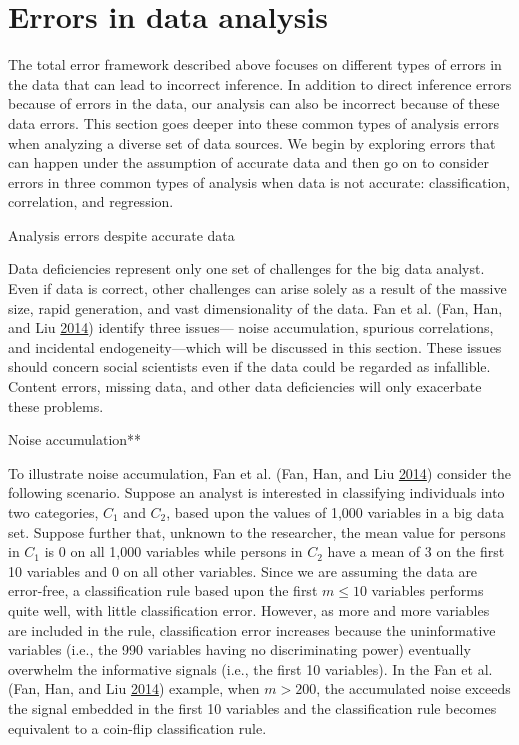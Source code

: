\documentclass[]{krantz}
\begin{document}
\section{Errors in data analysis}\label{sec:10-4}

The total error framework described above focuses on different types of
errors in the data that can lead to incorrect inference. In addition to
direct inference errors because of errors in the data, our analysis can
also be incorrect because of these data errors. This section goes deeper
into these common types of analysis errors when analyzing a diverse set
of data sources. We begin by exploring errors that can happen under the
assumption of accurate data and then go on to consider errors in three
common types of analysis when data is not accurate: classification,
correlation, and regression.

Analysis errors despite accurate data

Data deficiencies represent only one set of challenges for the big data
analyst. Even if data is correct, other challenges can arise solely as a
result of the massive size, rapid generation, and vast dimensionality of
the data. Fan et al. (Fan, Han, and Liu
\protect\hyperlink{ref-fan2014challenges}{2014}) identify three
issues--- noise accumulation, spurious correlations, and incidental
endogeneity---which will be discussed in this section. These issues
should concern social scientists even if the data could be regarded as
infallible. Content errors, missing data, and other data deficiencies
will only exacerbate these problems.

Noise accumulation**

To illustrate noise accumulation, Fan et al. (Fan, Han, and Liu
\protect\hyperlink{ref-fan2014challenges}{2014}) consider the following
scenario. Suppose an analyst is interested in classifying individuals
into two categories, \(C_{1}\) and \(C_{2}\), based upon the values of
1,000 variables in a big data set. Suppose further that, unknown to the
researcher, the mean value for persons in \(C_{1}\) is 0 on all 1,000
variables while persons in \(C_{2}\) have a mean of 3 on the first 10
variables and 0 on all other variables. Since we are assuming the data
are error-free, a classification rule based upon the first \(m \le 10\)
variables performs quite well, with little classification error.
However, as more and more variables are included in the rule,
classification error increases because the uninformative variables
(i.e., the 990 variables having no discriminating power) eventually
overwhelm the informative signals (i.e., the first 10 variables). In the
Fan et al. (Fan, Han, and Liu
\protect\hyperlink{ref-fan2014challenges}{2014}) example, when
\(m > 200\), the accumulated noise exceeds the signal embedded in the
first 10 variables and the classification rule becomes equivalent to a
coin-flip classification rule.
\end{document}
